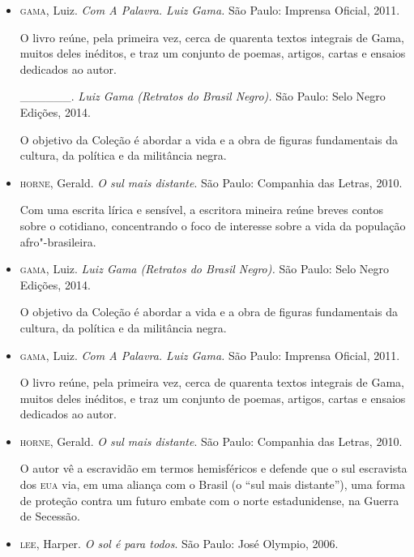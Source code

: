 \documentclass[12pt]{extarticle}
\begin{document}
\begin{itemize}
Com uma escrita lírica e sensível, a escritora mineira reúne breves
contos sobre o cotidiano, concentrando o foco de interesse sobre a vida
da população afro"-brasileira.

\item\textsc{gama}, Luiz. \textit{Com A Palavra. Luiz Gama.} São Paulo: Imprensa
Oficial, 2011.

O livro reúne, pela primeira vez, cerca de quarenta textos integrais de
Gama, muitos deles inéditos, e traz um conjunto de poemas, artigos,
cartas e ensaios dedicados ao autor.

\_\_\_\_\_\_. \textit{Luiz Gama (Retratos do Brasil Negro).} São Paulo:
Selo Negro Edições, 2014.

O objetivo da Coleção é abordar a vida e a obra de figuras fundamentais
da cultura, da política e da militância negra.

\item\textsc{horne}, Gerald. \textit{O sul mais distante}. São Paulo: Companhia das
  Letras, 2010.

Com uma escrita lírica e sensível, a escritora mineira reúne breves
contos sobre o cotidiano, concentrando o foco de interesse sobre a vida
da população afro"-brasileira.

\item\textsc{gama}, Luiz. \textit{Luiz Gama (Retratos do Brasil Negro).} São Paulo:
Selo Negro Edições, 2014.

O objetivo da Coleção é abordar a vida e a obra de figuras fundamentais
da cultura, da política e da militância negra.

\item\textsc{gama}, Luiz. \textit{Com A Palavra. Luiz Gama.} São Paulo: Imprensa
Oficial, 2011.

O livro reúne, pela primeira vez, cerca de quarenta textos integrais de
Gama, muitos deles inéditos, e traz um conjunto de poemas, artigos,
cartas e ensaios dedicados ao autor.

\item \textsc{horne}, Gerald. \textit{O sul mais distante}. São Paulo: Companhia das Letras, 2010.

O autor vê a escravidão em termos hemisféricos e defende que o sul
escravista dos \textsc{eua} via, em uma aliança com o Brasil (o ``sul mais
distante''), uma forma de proteção contra um futuro embate com o norte
estadunidense, na Guerra de Secessão.

\item\textsc{lee}, Harper. \textit{O sol é para todos}. São Paulo: José Olympio,
  2006.


\end{itemize}
\end{document}
